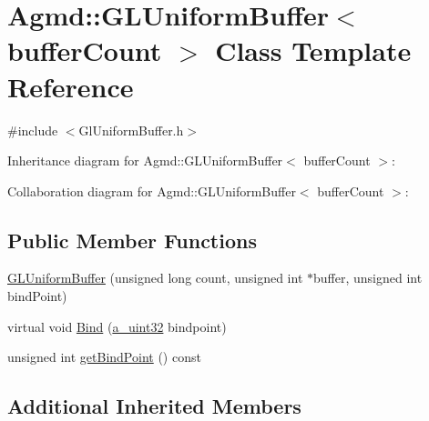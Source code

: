 \hypertarget{class_agmd_1_1_g_l_uniform_buffer}{\section{Agmd\+:\+:G\+L\+Uniform\+Buffer$<$ buffer\+Count $>$ Class Template Reference}
\label{class_agmd_1_1_g_l_uniform_buffer}
}


{\ttfamily \#include $<$Gl\+Uniform\+Buffer.\+h$>$}



Inheritance diagram for Agmd\+:\+:G\+L\+Uniform\+Buffer$<$ buffer\+Count $>$\+:


Collaboration diagram for Agmd\+:\+:G\+L\+Uniform\+Buffer$<$ buffer\+Count $>$\+:
\subsection*{Public Member Functions}
\begin{DoxyCompactItemize}
\item 
\hyperlink{class_agmd_1_1_g_l_uniform_buffer_a81c56eeb43e5f7761221a64dd07d3998}{G\+L\+Uniform\+Buffer} (unsigned long count, unsigned int $\ast$buffer, unsigned int bind\+Point)
\item 
virtual void \hyperlink{class_agmd_1_1_g_l_uniform_buffer_a3eb59228ab1366d6f802559d0e372aba}{Bind} (\hyperlink{_common_defines_8h_a964296f9770051b9e4807b1f180dd416}{a\+\_\+uint32} bindpoint)
\item 
unsigned int \hyperlink{class_agmd_1_1_g_l_uniform_buffer_a8fb28ebefdb8572b79ff018349ebcde9}{get\+Bind\+Point} () const 
\end{DoxyCompactItemize}
\subsection*{Additional Inherited Members}


